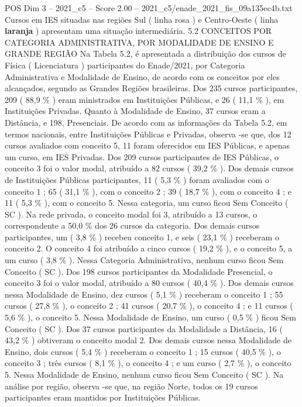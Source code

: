 \begin{textsample}{POS Dim 3 – 2021\_c5 – Score 2.00 – 2021\_c5/enade\_2021\_fis\_09a135ec4b.txt}
Cursos em IES situadas nas regiões Sul ( linha rosa ) e Centro-Oeste ( linha \textbf{laranja} ) apresentam uma situação intermediária. 5.2 CONCEITOS POR CATEGORIA ADMINISTRATIVA, POR MODALIDADE DE ENSINO E GRANDE REGIÃO Na Tabela 5.2, é apresentada a distribuição dos cursos de Física ( Licenciatura ) participantes do Enade/2021, por Categoria Administrativa e Modalidade de Ensino, de acordo com os conceitos por eles alcançados, segundo as Grandes Regiões brasileiras.
Dos 235 cursos participantes, 209 ( 88,9 \% ) eram ministrados em Instituições Públicas, e 26 ( 11,1 \% ), em Instituições Privadas.
Quanto à Modalidade de Ensino, 37 cursos eram a Distância, e 198, Presenciais.
De acordo com as informações da Tabela 5.2, em termos nacionais, entre Instituições Públicas e Privadas, observa -se que, dos 12 cursos avaliados com conceito 5, 11 foram oferecidos em IES Públicas, e apenas um curso, em IES Privadas.
Dos 209 cursos participantes de IES Públicas, o conceito 3 foi o valor modal, atribuído a 82 cursos ( 39,2 \% ).
Dos demais cursos de Instituições Públicas participantes, 11 ( 5,3 \% ) foram avaliados com o conceito 1 ; 65 ( 31,1 \% ), com o conceito 2 ; 39 ( 18,7 \% ), com o conceito 4 ; e 11 ( 5,3 \% ), com o conceito 5.
Nessa categoria, um curso ficou Sem Conceito ( SC ).
Na rede privada, o conceito modal foi 3, atribuído a 13 cursos, o correspondente a 50,0 \% dos 26 cursos da categoria.
Dos demais cursos participantes, um ( 3,8 \% ) recebeu conceito 1, e seis ( 23,1 \% ) receberam o conceito 2.
O conceito 4 foi atribuído a cinco cursos ( 19,2 \% ), e o conceito 5, a um curso ( 3,8 \% ).
Nessa Categoria Administrativa, nenhum curso ficou Sem Conceito ( SC ).
Dos 198 cursos participantes da Modalidade Presencial, o conceito 3 foi o valor modal, atribuído a 80 cursos ( 40,4 \% ).
Dos demais cursos nessa Modalidade de Ensino, dez cursos ( 5,1 \% ) receberam o conceito 1 ; 55 cursos ( 27,8 \% ), o conceito 2 ; 41 cursos ( 20,7 \% ), o conceito 4 ; e 11 cursos ( 5,6 \% ), o conceito 5.
Nessa Modalidade de Ensino, um curso ( 0,5 \% ) ficou Sem Conceito ( SC ).
Dos 37 cursos participantes da Modalidade a Distância, 16 ( 43,2 \% ) obtiveram o conceito modal 2.
Dos demais cursos nessa Modalidade de Ensino, dois cursos ( 5,4 \% ) receberam o conceito 1 ; 15 cursos ( 40,5 \% ), o conceito 3 ; três cursos ( 8,1 \% ), o conceito 4 ; e um curso ( 2,7 \% ), o conceito 5.
Nessa Modalidade de Ensino, nenhum curso ficou Sem Conceito ( SC ).
Na análise por região, observa -se que, na região Norte, todos os 19 cursos participantes eram mantidos por Instituições Públicas.

\end{textsample}

